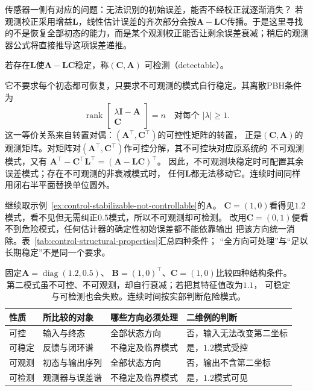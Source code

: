 传感器一侧有对应的问题：无法识别的初始误差，能否不经校正就逐渐消失？
若观测校正采用增益\(\bm L\)，线性估计误差的齐次部分会按\(\bm A-\bm L\bm C\)传播。于是这里寻找的不是恢复全部初态的能力，而是某个观测校正能否让剩余误差衰减；稍后的观测器公式将直接推导这项误差递推。
\begin{definition}[可检测性]
\label{def:control-detectability}
若存在$\bm L$使$\bm A-\bm L\bm C$稳定，称$(\bm C,\bm A)$
可检测（detectable）。
\end{definition}
它不要求每个初态都可恢复，只要求不可观测的模式自行稳定。其离散PBH条件为
\begin{equation}
  \operatorname{rank}
  \begin{bmatrix}\lambda\bm I-\bm A\\\bm C\end{bmatrix}=n
  \quad\text{对每个 }|\lambda|\geq1.
  \label{eq:control-pbh-detectability}
\end{equation}
这一等价关系来自转置对偶：$(\bm A^\top,\bm C^\top)$的可控性矩阵的转置，
正是$(\bm C,\bm A)$的观测矩阵。对矩阵对$(\bm A^\top,\bm C^\top)$作可控分解，其不可控块对应原系统的
不可观测模式，又有
$\bm A^\top-\bm C^\top\bm L^\top=(\bm A-\bm L\bm C)^\top$。
因此，不可观测块稳定时可配置其余误差模式；存在不可观测的非衰减模式时，
任何$\bm L$都无法移动它。连续时间同样用闭右半平面替换单位圆外。

继续取示例~\ref{ex:control-stabilizable-not-controllable}的$\bm A$。
$\bm C=(1,0)$看得见$1.2$模式，看不见但无需纠正$0.5$模式，所以不可观测却可检测。
改用$\bm C=(0,1)$便看不到危险模式，任何估计器的确定性初始误差都不能依靠输出
把该方向统一消除。表~\ref{tab:control-structural-properties}汇总四种条件；
“全方向可处理”与“足以长期稳定”不是同一个要求。
\begin{table}[htbp]
  \centering
  \begin{tabularx}{\linewidth}{lXXX}
    \toprule
    性质 & 所比较的对象 & 哪些方向必须处理 & 二维例的判断\\
    \midrule
    可控 & 输入与终态 & 全部状态方向 & 否，输入无法改变第二坐标\\
    可稳定 & 反馈与闭环谱 & 不稳定及临界模式 & 是，$1.2$模式受控\\
    可观测 & 初态与输出序列 & 全部状态方向 & 否，输出不含第二坐标\\
    可检测 & 观测器与误差谱 & 不稳定及临界模式 & 是，$1.2$模式可见\\
    \bottomrule
  \end{tabularx}
  \caption{固定$\bm A=\operatorname{diag}(1.2,0.5)$、
  $\bm B=(1,0)^\top$、$\bm C=(1,0)$比较四种结构条件。
  第二模式虽不可控、不可观测，却自行衰减；若把其特征值改为$1.1$，
  可稳定与可检测也会失败。连续时间按实部判断危险模式。}
  \label{tab:control-structural-properties}
  \label{tab:control-structural-comparison}
\end{table}

